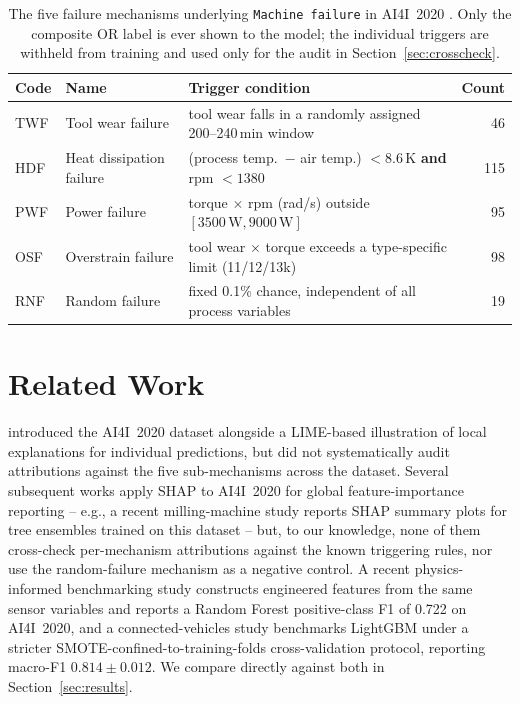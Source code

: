 \documentclass[11pt]{article}
\begin{document}
\begin{table}[htbp]
\centering
\caption{The five failure mechanisms underlying \texttt{Machine failure} in AI4I~2020
\citep{matzka2020explainable}. Only the composite OR label is ever shown to the model; the
individual triggers are withheld from training and used only for the audit in
Section~\ref{sec:crosscheck}.}
\label{tab:mechanisms}
\begin{tabular}{@{}llp{7cm}r@{}}
\toprule
Code & Name & Trigger condition & Count \\
\midrule
TWF & Tool wear failure & tool wear falls in a randomly assigned 200--240\,min window & 46 \\
HDF & Heat dissipation failure & (process temp.\ $-$ air temp.) $< 8.6$\,K \textbf{and} rpm $< 1380$ & 115 \\
PWF & Power failure & torque $\times$ rpm (rad/s) outside $[3500\,\text{W}, 9000\,\text{W}]$ & 95 \\
OSF & Overstrain failure & tool wear $\times$ torque exceeds a type-specific limit (11/12/13k) & 98 \\
RNF & Random failure & fixed 0.1\% chance, independent of all process variables & 19 \\
\bottomrule
\end{tabular}
\end{table}

\section{Related Work}

\citet{matzka2020explainable} introduced the AI4I~2020 dataset alongside a LIME-based
illustration of local explanations for individual predictions, but did not systematically audit
attributions against the five sub-mechanisms across the dataset. Several subsequent works apply
SHAP to AI4I~2020 for global feature-importance reporting -- e.g., a recent milling-machine study
\citep{milling2025shap} reports SHAP summary plots for tree ensembles trained on this dataset --
but, to our knowledge, none of them cross-check per-mechanism attributions against the known
triggering rules, nor use the random-failure mechanism as a negative control. A recent
physics-informed benchmarking study \citep{physicsinformed2026} constructs engineered features from
the same sensor variables and reports a Random Forest positive-class F1 of 0.722 on AI4I~2020, and
a connected-vehicles study \citep{connectedvehicles2026} benchmarks LightGBM under a stricter
SMOTE-confined-to-training-folds cross-validation protocol, reporting macro-F1 $0.814 \pm 0.012$.
We compare directly against both in Section~\ref{sec:results}.
\end{document}
